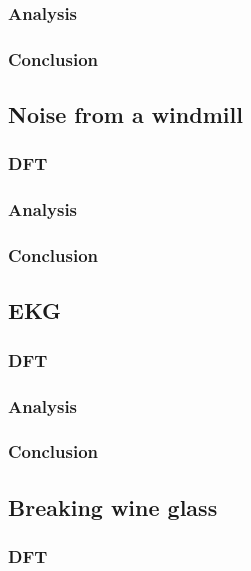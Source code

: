 \subsubsection{Analysis}



\subsubsection{Conclusion}

\subsection{Noise from a windmill}
\subsubsection{DFT}

\subsubsection{Analysis}

\subsubsection{Conclusion}

\subsection{EKG}
\subsubsection{DFT}

\subsubsection{Analysis}

\subsubsection{Conclusion}

\subsection{Breaking wine glass}
\subsubsection{DFT}

